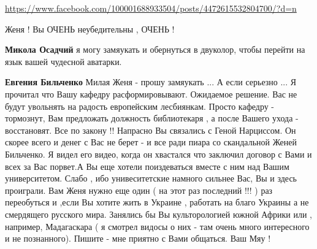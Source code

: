 \begin{itemize}
 
\url{https://www.facebook.com/100001688933504/posts/4472615532804700/?d=n}

 
Женя ! Вы ОЧЕНЬ неубедительны , ОЧЕНЬ !

\begin{itemize}
 
\textbf{Микола Осадчий} я могу замяукать и обернуться в двуколор, чтобы перейти на язык вашей чудесной аватарки.

 
\textbf{Евгения Бильченко} Милая Женя - прошу замяукать ... А если серьезно ...
Я прочитал что Вашу кафедру расформировывают. Ожидаемое решение. Вас не будут
увольнять на радость европейским лесбиянкам. Просто кафедру - тормознут, Вам
предложать должность библиотекаря , а после Вашего ухода - восстановят. Все по
закону !! Напрасно Вы связались с Геной Нарциссом. Он скорее всего и денег с
Вас не берет - и все ради пиара со скандальной Женей Бильченко. Я видел его
видео, когда он хвастался что заключил договор с Вами и всех за Вас порвет.А Вы
еще хотели поиздеваться вместе с ним над Вашим университетом. Слабо , ибо
унивеситетские намного сильнее Вас, Вы и здесь проиграли. Вам Женя нужно еще
один ( на этот раз последний !!! ) раз переобуться и ,если Вы хотите жить в
Украине , работать на благо Украины а не смердящего русского мира. Занялись бы
Вы культорологией южной Африки или , например, Мадагаскара ( я смотрел видосы о
них - там очень много интересного и не познанного). Пишите - мне приятно с Вами
общаться. Ваш Мяу !


\end{itemize}
\end{itemize}
